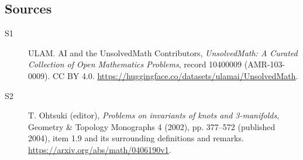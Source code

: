 \documentclass[11pt]{article}
\begin{document}
\subsection{Sources}
\begin{description}
\item[\hypertarget{source:10400009:1}{S1}] ULAM. AI and the UnsolvedMath Contributors, \emph{UnsolvedMath: A Curated Collection of Open Mathematics Problems}, record 10400009 (AMR-103-0009). CC BY 4.0. \url{https://huggingface.co/datasets/ulamai/UnsolvedMath}.
\item[\hypertarget{source:10400009:2}{S2}] T. Ohtsuki (editor), \emph{Problems on invariants of knots and 3-manifolds}, Geometry \& Topology Monographs 4 (2002), pp. 377--572 (published 2004), item 1.9 and its surrounding definitions and remarks. \url{https://arxiv.org/abs/math/0406190v1}.
\end{description}
\label{end:10400009}
\end{document}
